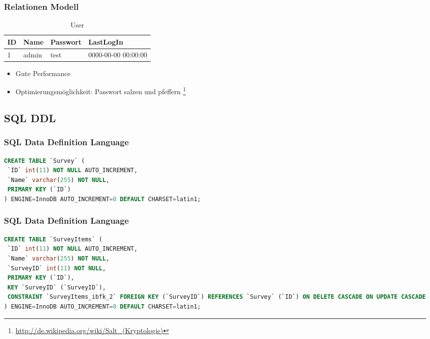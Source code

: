\documentclass[xcolor=dvipsnames]{beamer}
\begin{document}
\begin{frame} %
  \frametitle{Relationen Modell} %

\begin{table}
\begin{tabular}{|l|l|l|l|} \hline\hline
\textbf{ID} & \textbf{Name}  & \textbf{Passwort} & \textbf{LastLogIn}\\
\hline
1 & admin & test & 0000-00-00 00:00:00 \\
\hline\hline
\end{tabular}
  \caption{User}
  \end{table}

	\begin{block}{}		
		\begin{itemize}[]
			\item Gute Performance 
			\item Optimierungsmöglichkeit: Passwort salzen und pfeffern \footnote{\url{http://de.wikipedia.org/wiki/Salt_(Kryptologie)}}
		\end{itemize}
	\end{block}

\end{frame}


\subsection{SQL DDL}
\begin{frame}[fragile] %
\frametitle{SQL Data Definition Language} %

\begin{lstlisting}[language=SQL, caption=Survey]
CREATE TABLE `Survey` (
 `ID` int(11) NOT NULL AUTO_INCREMENT,
 `Name` varchar(255) NOT NULL,
 PRIMARY KEY (`ID`)
) ENGINE=InnoDB AUTO_INCREMENT=0 DEFAULT CHARSET=latin1;
\end{lstlisting} 
\end{frame}

\begin{frame}[fragile] %
\frametitle{SQL Data Definition Language} %

\begin{lstlisting}[language=SQL, caption=SurveyItems]
CREATE TABLE `SurveyItems` (
 `ID` int(11) NOT NULL AUTO_INCREMENT,
 `Name` varchar(255) NOT NULL,
 `SurveyID` int(11) NOT NULL,
 PRIMARY KEY (`ID`),
 KEY `SurveyID` (`SurveyID`),
 CONSTRAINT `SurveyItems_ibfk_2` FOREIGN KEY (`SurveyID`) REFERENCES `Survey` (`ID`) ON DELETE CASCADE ON UPDATE CASCADE
) ENGINE=InnoDB AUTO_INCREMENT=0 DEFAULT CHARSET=latin1;
\end{lstlisting} 
\end{frame}
\end{document}
